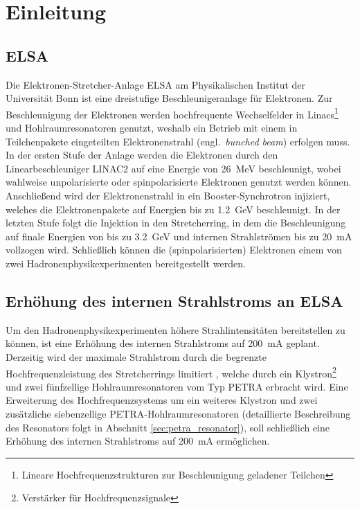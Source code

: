 \chapter{Einleitung}
\label{sec:einleitung}

\section{ELSA}
Die Elektronen-Stretcher-Anlage ELSA am Physikalischen Institut der Universität Bonn ist eine dreistufige Beschleunigeranlage für Elektronen.
Zur Beschleunigung der Elektronen werden hochfrequente Wechselfelder in Linacs\footnote{Lineare Hochfrequenzstrukturen zur Beschleunigung geladener Teilchen} und Hohlraumresonatoren genutzt, weshalb ein Betrieb mit einem in Teilchenpakete eingeteilten Elektronenstrahl (engl.\ \textit{bunched beam}) erfolgen muss.
In der ersten Stufe der Anlage werden die Elektronen durch den Linearbeschleuniger LINAC2 auf eine Energie von \SI{26}{MeV} beschleunigt, wobei wahlweise unpolarisierte oder spinpolarisierte Elektronen genutzt werden können.
Anschließend wird der Elektronenstrahl in ein Booster-Synchrotron injiziert, welches die Elektronenpakete auf Energien bis zu \SI{1.2}{GeV} beschleunigt.
In der letzten Stufe folgt die Injektion in den Stretcherring, in dem die Beschleunigung auf finale Energien von bis zu \SI{3.2}{GeV} und internen Strahlströmen bis zu \SI{20}{mA} vollzogen wird.
Schließlich können die (spinpolarisierten) Elektronen einem von zwei Hadronenphysikexperimenten bereitgestellt werden.


\section{Erhöhung des internen Strahlstroms an ELSA}
Um den Hadronenphysikexperimenten höhere Strahlintensitäten bereitstellen zu können, ist eine Erhöhung des internen Strahlstroms auf \SI{200}{mA} geplant.
Derzeitig wird der maximale Strahlstrom durch die begrenzte Hochfrequenzleistung des Stretcherrings limitiert \cite{schedler}, welche durch ein Klystron\footnote{Verstärker für Hochfrequenzsignale} und zwei fünfzellige Hohlraumresonatoren vom Typ PETRA erbracht wird.
Eine Erweiterung des Hochfrequenzsystems um ein weiteres Klystron und zwei zusätzliche siebenzellige PETRA-Hohlraumresonatoren (detaillierte Beschreibung des Resonators folgt in Abschnitt \ref{sec:petra_resonator}), soll schließlich eine Erhöhung des internen Strahlstroms auf \SI{200}{mA} ermöglichen.

